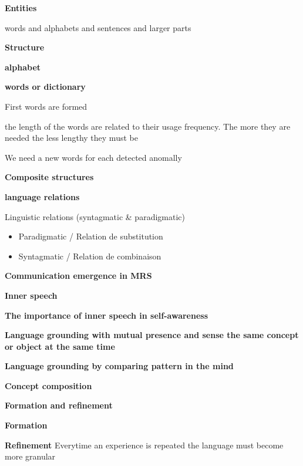 \documentclass{book}
\providecommand{\ProjectDeepHeading}[2]{%
    \par\medskip\noindent\textbf{#2}\par\smallskip
}
\begin{document}
        \ProjectDeepHeading{6}{Entities}
            
            words and alphabets and sentences and larger parts
            
        
        
    
\ProjectDeepHeading{3}{Structure}
    \ProjectDeepHeading{4}{alphabet}
    \ProjectDeepHeading{4}{words or dictionary}
        First words are formed
        
        the length of the words are related to their usage frequency. The more they are needed the less lengthy they must be
        
        We need a new words for each detected anomally
        
    \ProjectDeepHeading{4}{Composite structures}
    
    
    

\ProjectDeepHeading{3}{language relations}
    Linguistic relations (syntagmatic \& paradigmatic)
    \begin{itemize}
        \item Paradigmatic / Relation de substitution
        \item Syntagmatic / Relation de combinaison
    \end{itemize}

\ProjectDeepHeading{3}{Communication emergence in MRS}

\ProjectDeepHeading{3}{Inner speech}
    \textbf{The importance of inner speech in self-awareness} 

\ProjectDeepHeading{3}{Language grounding with mutual presence and sense the same concept or object at the same time}

\ProjectDeepHeading{3}{Language grounding by comparing pattern in the mind}

\ProjectDeepHeading{3}{Concept composition}

\ProjectDeepHeading{3}{Formation and refinement}
    \textbf{Formation}

    \textbf{Refinement} Everytime an experience is repeated the language must become more granular
    
\end{document}
